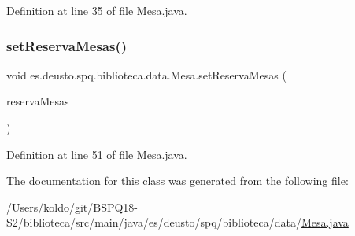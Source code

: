 Definition at line 35 of file Mesa.\+java.

\mbox{\label{classes_1_1deusto_1_1spq_1_1biblioteca_1_1data_1_1_mesa_af960339335802227aa788285130eb4c7}} 
\subsubsection{\texorpdfstring{set\+Reserva\+Mesas()}{setReservaMesas()}}
{\footnotesize\ttfamily void es.\+deusto.\+spq.\+biblioteca.\+data.\+Mesa.\+set\+Reserva\+Mesas (\begin{DoxyParamCaption}\item[{List$<$ \mbox{\hyperlink{classes_1_1deusto_1_1spq_1_1biblioteca_1_1data_1_1_reserva_mesa}{Reserva\+Mesa}} $>$}]{reserva\+Mesas }\end{DoxyParamCaption})}



Definition at line 51 of file Mesa.\+java.



The documentation for this class was generated from the following file\+:\begin{DoxyCompactItemize}
\item 
/\+Users/koldo/git/\+B\+S\+P\+Q18-\/\+S2/biblioteca/src/main/java/es/deusto/spq/biblioteca/data/\mbox{\hyperlink{_mesa_8java}{Mesa.\+java}}\end{DoxyCompactItemize}
